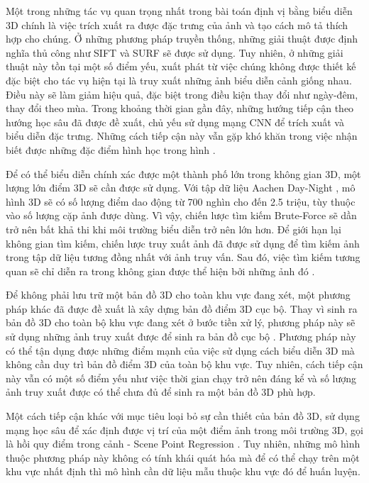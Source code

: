 Một trong những tác vụ quan trọng nhất trong bài toán định vị bằng biểu diễn 3D chính là việc trích xuất ra được đặc trưng của ảnh và tạo cách mô tả thích hợp cho chúng. Ở những phương pháp truyền thống, những giải thuật được định nghĩa thủ công như SIFT \cite{lowe2004distinctive} và SURF \cite{bay2006surf} sẽ được sử dụng. Tuy nhiên, ở những giải thuật này tồn tại một số điểm yếu, xuất phát từ việc chúng không được thiết kế đặc biệt cho tác vụ hiện tại là truy xuất những ảnh biểu diễn cảnh giống nhau. Điều này sẽ làm giảm hiệu quả, đặc biệt trong điều kiện thay đổi như ngày-đêm, thay đổi theo mùa. Trong khoảng thời gian gần đây, những hướng tiếp cận theo hướng học sâu đã được đề xuất, chủ yếu sử dụng mạng CNN để trích xuất và biểu diễn đặc trưng. Những cách tiếp cận này vẫn gặp khó khăn trong việc nhận biết được những đặc điểm hình học trong hình \cite{zhou2020learn}.

Để có thể biểu diễn chính xác được một thành phố lớn trong không gian 3D, một lượng lớn điểm 3D sẽ cần được sử dụng. Với tập dữ liệu Aachen Day-Night \cite{sattler2018benchmarking}, mô hình 3D sẽ có số lượng điểm dao động từ 700 nghìn cho đến 2.5 triệu, tùy thuộc vào số lượng cặp ảnh được dùng. Vì vậy, chiến lược tìm kiếm Brute-Force sẽ dần trở nên bất khả thi khi môi trường biểu diễn trở nên lớn hơn. Để giới hạn lại không gian tìm kiếm, chiến lược truy xuất ảnh đã được sử dụng để tìm kiếm ảnh trong tập dữ liệu tương đồng nhất với ảnh truy vấn. Sau đó, việc tìm kiếm tương quan sẽ chỉ diễn ra trong không gian được thể hiện bởi những ảnh đó \cite{sarlin2019coarse}.

Để không phải lưu trữ một bản đồ 3D cho toàn khu vực đang xét, một phương pháp khác đã được đề xuất là xây dựng bản đồ điểm 3D cục bộ. Thay vì sinh ra bản đồ 3D cho toàn bộ khu vực đang xét ở bước tiền xử lý, phương pháp này sẽ sử dụng những ảnh truy xuất được để sinh ra bản đồ cục bộ \cite{sattler2017large}. Phương pháp này có thể tận dụng được những điểm mạnh của việc sử dụng cách biểu diễn 3D mà không cần duy trì bản đồ điểm 3D của toàn bộ khu vực. Tuy nhiên, cách tiếp cận này vẫn có một số điểm yếu như việc thời gian chạy trở nên đáng kể và số lượng ảnh truy xuất được có thể chưa đủ để sinh ra một bản đồ 3D phù hợp.

Một cách tiếp cận khác với mục tiêu loại bỏ sự cần thiết của bản đồ 3D, sử dụng mạng học sâu để xác định được vị trí của một điểm ảnh trong môi trường 3D, gọi là hồi quy điểm trong cảnh - Scene Point Regression \cite{brachmann2021visual}. Tuy nhiên, những mô hình thuộc phương pháp này không có tính khái quát hóa mà để có thể chạy trên một khu vực nhất định thì mô hình cần dữ liệu mẫu thuộc khu vực đó để huấn luyện.

